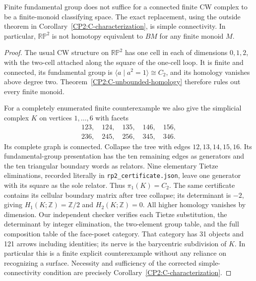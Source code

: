 \begin{proposition}
\label{CP2:C-conjecture-counterexample}
Finite fundamental group does not suffice for a connected finite CW
complex to be a finite-monoid classifying space.  The exact
replacement, using the outside theorem in
Corollary~\ref{CP2:C-characterization}, is simple connectivity.
In particular, $\mathbb{RP}^2$ is not homotopy equivalent to $BM$
for any finite monoid $M$.
\end{proposition}
\begin{proof}
The usual CW structure on $\mathbb{RP}^2$ has one cell in each of
dimensions $0,1,2$, with the two-cell attached along the square of
the one-cell loop.  It is finite and connected, its fundamental
group is $\langle a\mid a^2=1\rangle\cong C_2$, and its homology
vanishes above degree two.  Theorem~\ref{CP2:C-unbounded-homology}
therefore rules out every finite monoid.

For a completely enumerated finite counterexample we also give the
simplicial complex $K$ on vertices $1,\ldots,6$ with facets
\[
\begin{gathered}
123,\quad124,\quad135,\quad146,\quad156,\\
236,\quad245,\quad256,\quad345,\quad346.
\end{gathered}
\]
Its complete graph is connected.  Collapse the tree with edges
$12,13,14,15,16$.  Its fundamental-group presentation has the ten
remaining edges as generators and the ten triangular boundary
words as relators.  Nine elementary Tietze eliminations, recorded
literally in \texttt{rp2\_certificate.json}, leave one generator
with its square as the sole relator.  Thus $\pi_1(K)=C_2$.
The same certificate contains its cellular boundary matrix after
tree collapse; its determinant is $-2$, giving
$H_1(K;\mathbb Z)=\mathbb Z/2$ and $H_2(K;\mathbb Z)=0$.
All higher homology vanishes by dimension.  Our independent checker
verifies each Tietze substitution, the determinant by integer
elimination, the two-element group table, and the full composition
table of the face-poset category.  That category has 31 objects and
121 arrows including identities; its nerve is the barycentric
subdivision of $K$.  In particular this is a finite explicit
counterexample without any reliance on recognizing a surface.
Necessity and sufficiency of the corrected simple-connectivity
condition are precisely
Corollary~\ref{CP2:C-characterization}.
\end{proof}
